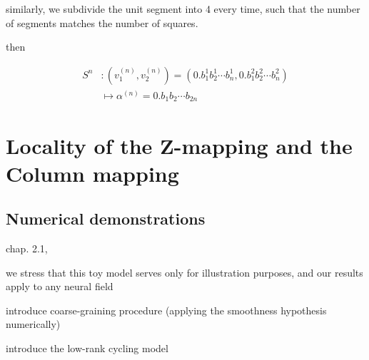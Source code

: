 \documentclass[NETN,manuscript]{stjour-new}
\begin{document}
similarly, we subdivide the unit segment into 4 every time, such that the number of segments matches the number of squares.

then

\begin{equation} \begin{aligned}
S^n &: (v_1^{(n)}, v_2^{(n)}) = (0.b_1^1 b_2^1 \cdots b_n^1, 0.b_1^2 b_2^2 \cdots b_n^2) \\
&\mapsto \alpha^{(n)} = 0.b_1 b_2 \cdots b_{2n}
\end{aligned} \end{equation}


\section{Locality of the Z-mapping and the Column mapping}









\subsection{Numerical demonstrations}

chap. 2.1, 

we stress that this toy model serves only for illustration purposes, and our results apply to any neural field

introduce coarse-graining procedure (applying the smoothness hypothesis numerically)

introduce the low-rank cycling model
\end{document}
